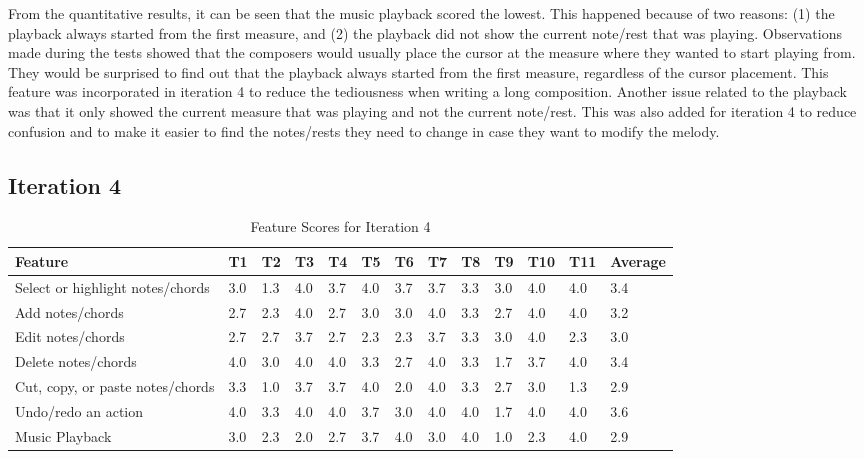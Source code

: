 			From the quantitative results, it can be seen that the music playback scored the lowest. This happened because of two reasons: (1) the playback always started from the first measure, and (2) the playback did not show the current note/rest that was playing. Observations made during the tests showed that the composers would usually place the cursor at the measure where they wanted to start playing from. They would be surprised to find out that the playback always started from the first measure, regardless of the cursor placement. This feature was incorporated in iteration 4 to reduce the tediousness when writing a long composition. Another issue related to the playback was that it only showed the current measure that was playing and not the current note/rest. This was also added for iteration 4 to reduce confusion and to make it easier to find the notes/rests they need to change in case they want to modify the melody. 


		\subsection{Iteration 4} %
		\label{sub:iteration_4}

			 \begin{landscape}				
				\begin{longtable}{|p{3.5cm}|R{.7cm}|R{.7cm}|R{.7cm}|R{.7cm}|R{.7cm}|R{.7cm}|R{.7cm}|R{.7cm}|R{.7cm}|R{.7cm}|R{.7cm}|R{1.5cm}|}
					\caption{Feature Scores for Iteration 4} \label{tab:results-features-it4} \\
					  	\hline
					  	\textbf{Feature} & \textbf{T1} & \textbf{T2} & \textbf{T3} & \textbf{T4} & \textbf{T5} & \textbf{T6} & \textbf{T7} & \textbf{T8} & \textbf{T9} & \textbf{T10} & \textbf{T11} & \textbf{Average} \\ \hline

					  	Select or highlight notes/chords 		& 3.0 & 1.3 & 4.0 & 3.7 & 4.0 & 3.7 & 3.7 & 3.3 & 3.0 & 4.0 & 4.0 & 3.4 \\ \hline
						Add notes/chords 							& 2.7 & 2.3 & 4.0 & 2.7 & 3.0 & 3.0 & 4.0 & 3.3 & 2.7 & 4.0 & 4.0 & 3.2 \\ \hline
						Edit notes/chords 							& 2.7 & 2.7 & 3.7 & 2.7 & 2.3 & 2.3 & 3.7 & 3.3 & 3.0 & 4.0 & 2.3 & 3.0 \\ \hline
						Delete notes/chords 						& 4.0 & 3.0 & 4.0 & 4.0 & 3.3 & 2.7 & 4.0 & 3.3 & 1.7 & 3.7 & 4.0 & 3.4 \\ \hline
						Cut, copy, or paste notes/chords 	& 3.3 & 1.0 & 3.7 & 3.7 & 4.0 & 2.0 & 4.0 & 3.3 & 2.7 & 3.0 & 1.3 & 2.9 \\ \hline
						Undo/redo an action 						& 4.0 & 3.3 & 4.0 & 4.0 & 3.7 & 3.0 & 4.0 & 4.0 & 1.7 & 4.0 & 4.0 & 3.6 \\ \hline
						Music Playback 								& 3.0 & 2.3 & 2.0 & 2.7 & 3.7 & 4.0 & 3.0 & 4.0 & 1.0 & 2.3 & 4.0 & 2.9 \\ \hline

				\end{longtable}
			\end{landscape} 


